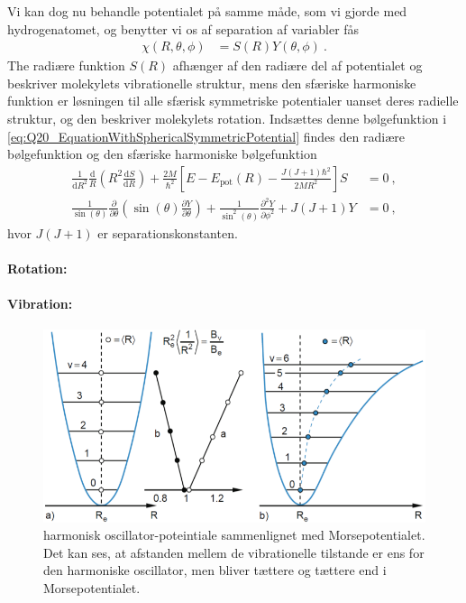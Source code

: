 Vi kan dog nu behandle potentialet på samme måde, som vi gjorde med hydrogenatomet, og benytter vi os af separation af variabler fås
\begin{align}
    \chi(R,\theta,\phi) &= S(R)Y(\theta,\phi) \: .
\end{align}
The radiære funktion $S(R)$ afhænger af den radiære del af potentialet og beskriver molekylets vibrationelle struktur, mens den sfæriske harmoniske funktion er løsningen til alle sfærisk symmetriske potentialer uanset deres radielle struktur, og den beskriver molekylets rotation.
Indsættes denne bølgefunktion i \cref{eq:Q20_EquationWithSphericalSymmetricPotential} findes den radiære bølgefunktion og den sfæriske harmoniske bølgefunktion
\begin{align}
    \frac{1}{\text{d}R^2}\frac{\text{d}}{R}\left(R^2 \frac{\text{d}S}{\text{d}R}\right) + \frac{2M}{\hbar^2}\left[E - E_\text{pot}(R) - \frac{J(J+1)\hbar^2}{2MR^2}\right]S &= 0 \: , \\
    \frac{1}{\sin(\theta)} \frac{\partial}{\partial \theta} \left(\sin(\theta) \frac{\partial Y}{\partial \theta}\right) + \frac{1}{\sin^2(\theta)} \frac{\partial^2 Y}{\partial \phi^2}  + J(J+1)Y &= 0 \: ,
\end{align}
hvor $J(J+1)$ er separationskonstanten.


\paragraph{Rotation:}


\paragraph{Vibration:}

\begin{figure}[!h]
    \centering
    \includegraphics[width=.8\textwidth]{Q20/images/AfstandMellemEnerginiveauerneIToForskelligePotentialleApproksimationer.PNG}
    \caption{harmonisk oscillator-poteintiale sammenlignet med Morsepotentialet. Det kan ses, at afstanden mellem de vibrationelle tilstande er ens for den harmoniske oscillator, men bliver tættere og tættere end i Morsepotentialet.}
    \label{fig:Q20_AfstandMellemEnerginiveauer}
\end{figure}


